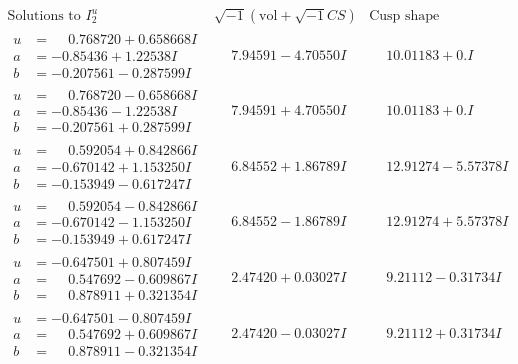 \documentclass[1p]{elsarticle_modified}
\theoremstyle{definition}
\newcommand{\I}{\sqrt{-1}}
\begin{document}
$$\begin{array}{c|c|c}  
\text{Solutions to }I^u_{2}& \I (\text{vol} + \sqrt{-1}CS) & \text{Cusp shape}\\
 \hline 
\begin{aligned}
u &= \phantom{-}0.768720 + 0.658668 I \\
a &= -0.85436 + 1.22538 I \\
b &= -0.207561 - 0.287599 I\end{aligned}
 & \phantom{-}7.94591 - 4.70550 I & \phantom{-}10.01183 + 0. I\phantom{ +0.000000I} \\ \hline\begin{aligned}
u &= \phantom{-}0.768720 - 0.658668 I \\
a &= -0.85436 - 1.22538 I \\
b &= -0.207561 + 0.287599 I\end{aligned}
 & \phantom{-}7.94591 + 4.70550 I & \phantom{-}10.01183 + 0. I\phantom{ +0.000000I} \\ \hline\begin{aligned}
u &= \phantom{-}0.592054 + 0.842866 I \\
a &= -0.670142 + 1.153250 I \\
b &= -0.153949 - 0.617247 I\end{aligned}
 & \phantom{-}6.84552 + 1.86789 I & \phantom{-}12.91274 - 5.57378 I \\ \hline\begin{aligned}
u &= \phantom{-}0.592054 - 0.842866 I \\
a &= -0.670142 - 1.153250 I \\
b &= -0.153949 + 0.617247 I\end{aligned}
 & \phantom{-}6.84552 - 1.86789 I & \phantom{-}12.91274 + 5.57378 I \\ \hline\begin{aligned}
u &= -0.647501 + 0.807459 I \\
a &= \phantom{-}0.547692 - 0.609867 I \\
b &= \phantom{-}0.878911 + 0.321354 I\end{aligned}
 & \phantom{-}2.47420 + 0.03027 I & \phantom{-}9.21112 - 0.31734 I \\ \hline\begin{aligned}
u &= -0.647501 - 0.807459 I \\
a &= \phantom{-}0.547692 + 0.609867 I \\
b &= \phantom{-}0.878911 - 0.321354 I\end{aligned}
 & \phantom{-}2.47420 - 0.03027 I & \phantom{-}9.21112 + 0.31734 I \\ \hline\begin{aligned}

\end{aligned}
\end{array}$$
\end{document}
